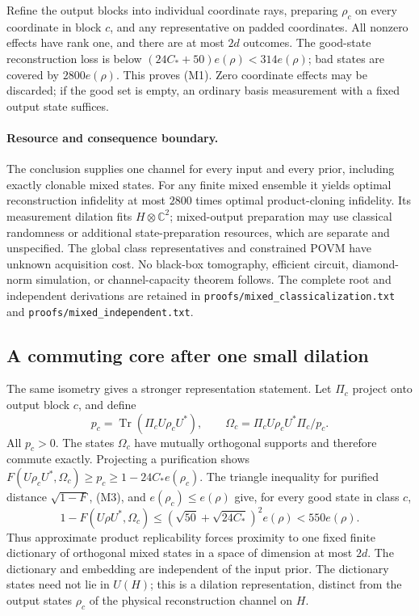 \documentclass[11pt]{article}
\newcommand{\Tr}{\operatorname{Tr}}
\begin{document}
Refine the output blocks into individual coordinate rays, preparing $\rho_c$ on every coordinate in block $c$, and any representative on padded coordinates. All nonzero effects have rank one, and there are at most $2d$ outcomes. The good-state reconstruction loss is below $(24C_*+50)e(\rho)<314e(\rho)$; bad states are covered by $2800e(\rho)$. This proves (M1). Zero coordinate effects may be discarded; if the good set is empty, an ordinary basis measurement with a fixed output state suffices.

\paragraph{Resource and consequence boundary.}
The conclusion supplies one channel for every input and every prior, including exactly clonable mixed states. For any finite mixed ensemble it yields optimal reconstruction infidelity at most $2800$ times optimal product-cloning infidelity. Its measurement dilation fits $H\otimes\mathbb C^2$; mixed-output preparation may use classical randomness or additional state-preparation resources, which are separate and unspecified. The global class representatives and constrained POVM have unknown acquisition cost. No black-box tomography, efficient circuit, diamond-norm simulation, or channel-capacity theorem follows. The complete root and independent derivations are retained in \texttt{proofs/mixed\_classicalization.txt} and \texttt{proofs/mixed\_independent.txt}.

\subsection{A commuting core after one small dilation}

The same isometry gives a stronger representation statement. Let $\Pi_c$ project onto output block $c$, and define
\[
p_c=\Tr(\Pi_cU\rho_cU^*),\qquad
\Omega_c=\Pi_cU\rho_cU^*\Pi_c/p_c.
\]
All $p_c>0$. The states $\Omega_c$ have mutually orthogonal supports and therefore commute exactly. Projecting a purification shows $F(U\rho_cU^*,\Omega_c)\ge p_c\ge1-24C_*e(\rho_c)$. The triangle inequality for purified distance $\sqrt{1-F}$, (M3), and $e(\rho_c)\le e(\rho)$ give, for every good state in class $c$,
\[
1-F(U\rho U^*,\Omega_c)
\le(\sqrt{50}+\sqrt{24C_*})^2e(\rho)<550e(\rho).
\tag{M8}
\]
Thus approximate product replicability forces proximity to one fixed finite dictionary of orthogonal mixed states in a space of dimension at most $2d$. The dictionary and embedding are independent of the input prior. The dictionary states need not lie in $U(H)$; this is a dilation representation, distinct from the output states $\rho_c$ of the physical reconstruction channel on $H$.
\end{document}
